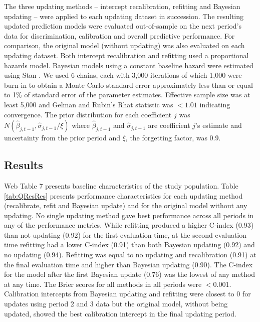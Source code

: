 \documentclass[]{article}
\begin{document}
The three updating methods -- intercept recalibration, refitting and Bayesian updating -- were applied to each updating dataset in succession. The resulting updated prediction models were evaluated out-of-sample on the next period's data for discrimination, calibration and overall predictive performance. For comparison, the original model (without updating) was also evaluated on each updating dataset. Both intercept recalibration and refitting used a proportional hazards model. Bayesian models using a constant baseline hazard were estimated using Stan \citep{Stan2020}. We used 6 chains, each with 3,000 iterations of which 1,000 were burn-in to obtain a Monte Carlo standard error approximately less than or equal to 1\% of standard error of the parameter estimates. Effective sample size was at least 5,000 and Gelman and Rubin's Rhat statistic \citep{Gelman1992} was $<1.01$ indicating convergence. The prior distribution for each coefficient $j$ was $N(\hat{\beta}_{j,t-1}, \hat{\sigma}_{j, t-1}/\xi)$ where $\hat{\beta}_{j,t-1}$ and $\hat{\sigma}_{j,t-1}$ are coefficient $j$'s estimate and uncertainty from the prior period and $\xi$, the forgetting factor, was 0.9.  



 
  






 
\subsection{Results}

Web Table 7 presents baseline characteristics of the study population. Table \ref{tab:QResRes} presents performance characteristics for each updating method (recalibrate, refit and Bayesian update) and for the original model without any updating. No single updating method gave best performance across all periods in any of the performance metrics. While refitting produced a higher C-index (0.93) than not updating (0.92) for the first evaluation time, at the second evaluation time refitting had a lower C-index (0.91) than both Bayesian updating (0.92) and no updating (0.94). Refitting was equal to no updating and recalibration (0.91) at the final evaluation time and higher than Bayesian updating (0.90). The C-index for the model after the first Bayesian update (0.76) was the lowest of any method at any time. The Brier scores for all methods in all periods were $<$0.001. Calibration intercepts from Bayesian updating and refitting were closest to 0 for updates using period 2 and 3 data but the original model, without being updated, showed the best calibration intercept in the final updating period.
\end{document}
